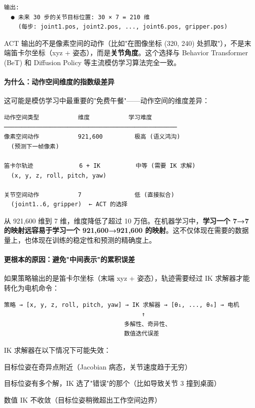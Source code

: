 \documentclass[UTF8,a4paper,11pt]{ctexart}
\begin{document}
{\begin{lstlisting}[language=text]
输出:
  ● 未来 30 步的关节目标位置: 30 × 7 = 210 维
    (每步: joint1.pos, joint2.pos, ..., joint6.pos, gripper.pos)
\end{lstlisting}

ACT 输出的不是像素空间的动作（比如"在图像坐标 (320, 240) 处抓取"），不是末端笛卡尔坐标（xyz + 姿态），而是\textbf{关节角度}。这个选择与 Behavior Transformer (BeT) 和 Diffusion Policy 等主流模仿学习算法完全一致。

\paragraph{为什么：动作空间维度的指数级差异}


这可能是模仿学习中最重要的"免费午餐"——动作空间的维度差异：

\begin{lstlisting}[language=text]
动作空间类型           维度           学习难度
─────────────────────────────────────────────────
像素空间动作           921,600         极高 (语义鸿沟)
  (预测下一帧像素)

笛卡尔轨迹             6 + IK          中等 (需要 IK 求解)
  (x, y, z, roll, pitch, yaw)

关节空间动作           7               低 (直接拟合)
  (joint1..6, gripper)  ← ACT 的选择
\end{lstlisting}

从 921,600 维到 7 维，维度降低了超过 10 万倍。在机器学习中，\textbf{学习一个 7→7 的映射远容易于学习一个 921,600→921,600 的映射}。这不仅体现在需要的数据量上，也体现在训练的稳定性和预测的精确度上。

\paragraph{更根本的原因：避免"中间表示"的累积误差}


如果策略输出的是笛卡尔坐标（末端 xyz + 姿态），轨迹需要经过 IK 求解器才能转化为电机命令：

\begin{lstlisting}[language=text]
策略 → [x, y, z, roll, pitch, yaw] → IK 求解器 → [θ₁, ..., θ₆] → 电机
                                       ↑
                                  多解性、奇异性、
                                  数值迭代误差
\end{lstlisting}

IK 求解器在以下情况下可能失效：
\item 目标位姿在奇异点附近（Jacobian 病态，关节速度趋于无穷）
\item 目标位姿有多个解，IK 选了"错误"的那个（比如导致关节 3 撞到桌面）
\item 数值 IK 不收敛（目标位姿稍微超出工作空间边界）

}
\end{document}

